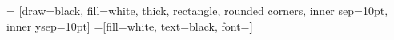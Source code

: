 

\newcommand{\tabItem}[2]{#1 & #2 \\ \noalign{\vskip 3pt} \hline \noalign{\vskip 3pt}}

 = [draw=black, fill=white, thick, rectangle, rounded corners, inner sep=10pt, inner ysep=10pt]
 =[fill=white, text=black, font=\bfseries]
